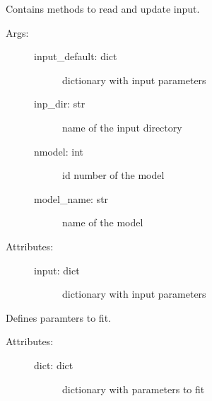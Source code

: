 \documentclass[letterpaper,10pt,english]{sphinxmanual}
\begin{document}
\begin{fulllineitems}
\label{\detokenize{modules/model:phlab.model.input_handler}}
Contains methods to read and update input.
\begin{description}
\item[{Args:}] \leavevmode\begin{description}
\item[{input\_default: dict}] \leavevmode
dictionary with input parameters

\item[{inp\_dir: str}] \leavevmode
name of the input directory

\item[{nmodel: int}] \leavevmode
id number of the model

\item[{model\_name: str}] \leavevmode
name of the model

\end{description}

\item[{Attributes:}] \leavevmode\begin{description}
\item[{input: dict}] \leavevmode
dictionary with input parameters

\end{description}

\end{description}

\end{fulllineitems}


\begin{fulllineitems}
\label{\detokenize{modules/model:phlab.model.parameters2fit}}
Defines paramters to fit.
\begin{description}
\item[{Attributes:}] \leavevmode\begin{description}
\item[{dict: dict}] \leavevmode
dictionary with parameters to fit

\end{description}

\end{description}

\end{fulllineitems}
\end{document}
